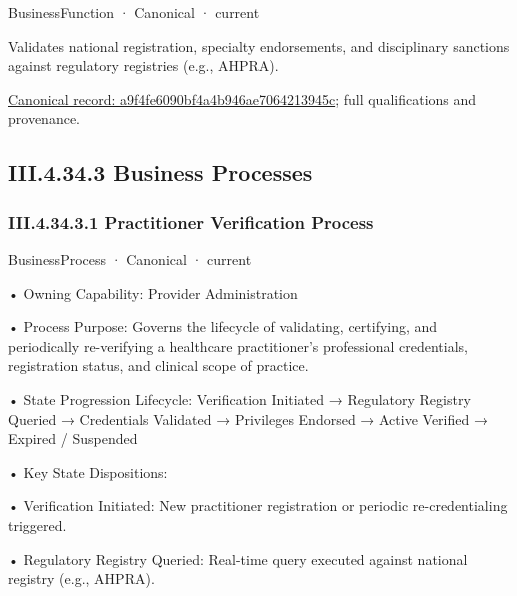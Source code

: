 \label{element:a9f4fe6090bf4a4b946ae7064213945c}
{\small BusinessFunction · Canonical · current}\par

Validates national registration, specialty endorsements, and disciplinary sanctions against regulatory registries (e.g., AHPRA).


{\footnotesize \href{../../../../continuum/business/business-function/a9f4fe6090bf4a4b946ae7064213945c.md}{Canonical record: a9f4fe6090bf4a4b946ae7064213945c}; full qualifications and provenance.}\par
\subsection*{III.4.34.3 Business Processes}
\label{navigation:III.4.34.3}

\subsubsection*{III.4.34.3.1 Practitioner Verification Process}
\label{navigation:III.4.34.3.1}

\label{element:32a3e1f948474d3aa77ca71bfa515f58}
{\small BusinessProcess · Canonical · current}\par

•
Owning Capability: Provider Administration



•
Process Purpose: Governs the lifecycle of validating, certifying, and periodically re-verifying a healthcare practitioner's professional credentials, registration status, and clinical scope of practice.



•
State Progression Lifecycle: Verification Initiated → Regulatory Registry Queried → Credentials Validated → Privileges Endorsed → Active Verified → Expired / Suspended



•
Key State Dispositions:



•
Verification Initiated: New practitioner registration or periodic re-credentialing triggered.



•
Regulatory Registry Queried: Real-time query executed against national registry (e.g., AHPRA).



